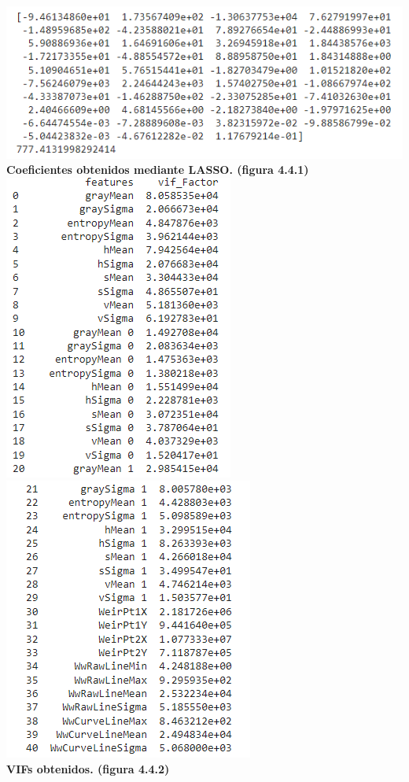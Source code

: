 \documentclass{article}
\begin{document}
        \begin{center}
                \includegraphics[scale=0.5]{images/lasso-discharge-1.PNG} \\
                \textbf{Coeficientes obtenidos mediante LASSO. (figura 4.4.1)}
                \includegraphics[scale=0.5]{images/discharge-variance-inflation-1.PNG} 
                \includegraphics[scale=0.5]{images/discharge-variance-inflation-2.PNG} \\
                \textbf{VIFs obtenidos. (figura 4.4.2)}\\
                
        \end{center}        
        
\end{document}
